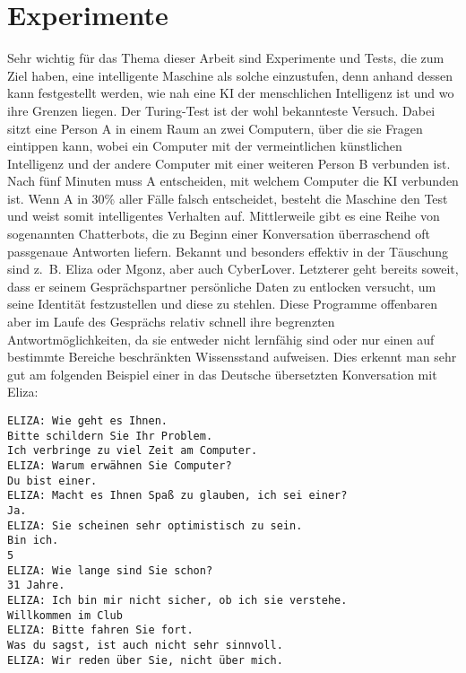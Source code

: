 \section{Experimente}
Sehr wichtig für das Thema dieser Arbeit sind Experimente und Tests, die zum Ziel haben, eine intelligente Maschine als solche einzustufen, denn anhand dessen kann festgestellt werden, wie nah eine KI der menschlichen Intelligenz ist und wo ihre Grenzen liegen.
Der Turing-Test ist der wohl bekannteste Versuch.
Dabei sitzt eine Person A in einem Raum an zwei Computern, über die sie Fragen eintippen kann, wobei ein Computer mit der vermeintlichen künstlichen Intelligenz und der andere Computer mit einer weiteren Person B verbunden ist.
Nach fünf Minuten muss A entscheiden, mit welchem Computer die KI verbunden ist.
Wenn A in 30\% aller Fälle falsch entscheidet, besteht die Maschine den Test und weist somit intelligentes Verhalten auf.
Mittlerweile gibt es eine Reihe von sogenannten Chatterbots, die zu Beginn einer Konversation überraschend oft passgenaue Antworten liefern.
Bekannt und besonders effektiv in der Täuschung sind z.~B.
Eliza oder Mgonz, aber auch CyberLover.
Letzterer geht bereits soweit, dass er seinem Gesprächspartner persönliche Daten zu entlocken versucht, um seine Identität festzustellen und diese zu stehlen.
Diese Programme offenbaren aber im Laufe des Gesprächs relativ schnell ihre begrenzten Antwortmöglichkeiten, da sie entweder nicht lernfähig sind oder nur einen auf bestimmte Bereiche beschränkten Wissensstand aufweisen.
Dies erkennt man sehr gut am folgenden Beispiel einer in das Deutsche übersetzten Konversation mit Eliza:

\begin{verbatim}
ELIZA: Wie geht es Ihnen.
Bitte schildern Sie Ihr Problem.
Ich verbringe zu viel Zeit am Computer.
ELIZA: Warum erwähnen Sie Computer?
Du bist einer.
ELIZA: Macht es Ihnen Spaß zu glauben, ich sei einer?
Ja.
ELIZA: Sie scheinen sehr optimistisch zu sein.
Bin ich.
5
ELIZA: Wie lange sind Sie schon?
31 Jahre.
ELIZA: Ich bin mir nicht sicher, ob ich sie verstehe.
Willkommen im Club
ELIZA: Bitte fahren Sie fort.
Was du sagst, ist auch nicht sehr sinnvoll.
ELIZA: Wir reden über Sie, nicht über mich.
\end{verbatim}

